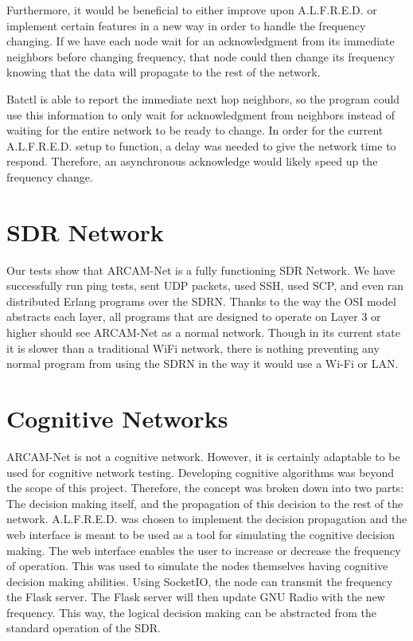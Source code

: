 Furthermore, it would be beneficial to either improve upon A.L.F.R.E.D. or implement certain features in a new way in order to handle the frequency changing. If we have each node wait for an acknowledgment from its immediate neighbors before changing frequency, that node could then change its frequency knowing that the data will propagate to the rest of the network. 

Batctl is able to report the immediate next hop neighbors, so the program could use this information to only wait for acknowledgment from neighbors instead of waiting for the entire network to be ready to change. In order for the current A.L.F.R.E.D. setup to function, a delay was needed to give the network time to respond. Therefore, an asynchronous acknowledge would likely speed up the frequency change. 



\section{SDR Network}

Our tests show that ARCAM-Net is a fully functioning SDR Network. We have  successfully run ping tests, sent UDP packets, used SSH, used SCP, and even ran distributed Erlang programs over the SDRN. Thanks to the way the OSI model abstracts each layer, all programs that are designed to operate on Layer 3 or higher should see ARCAM-Net as a normal network. Though in its current state it is slower than a traditional WiFi network, there is nothing preventing any normal program from using the SDRN in the way it would use a Wi-Fi or LAN. 


\section{Cognitive Networks}

ARCAM-Net is not a cognitive network. However, it is certainly adaptable to be used for cognitive network testing. Developing cognitive algorithms was beyond the scope of this project. Therefore, the concept was broken down into two parts: The decision making itself, and the propagation of this decision to the rest of the network. A.L.F.R.E.D. was chosen to implement the decision propagation and the web interface is meant to be used as a tool for simulating the cognitive decision making. The web interface enables the user to increase or decrease the frequency of operation. This was used to simulate the nodes themselves having cognitive decision making abilities. Using SocketIO, the node can transmit the frequency the Flask server. The Flask server will then update GNU Radio with the new frequency. This way, the logical decision making can be abstracted from the standard operation of the SDR. 

